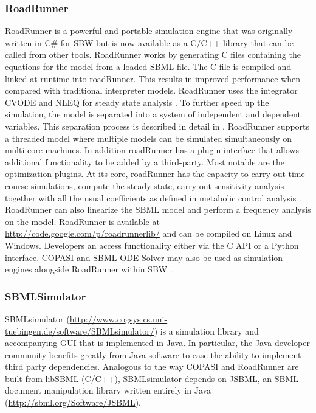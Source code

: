 \subsubsection{RoadRunner}

RoadRunner is a powerful and portable simulation engine that was
originally written in C\# for SBW but is now available as a C/C++
library that can be called from other tools. RoadRunner works by
generating C files containing the equations for the model from a loaded
SBML file. The C file is compiled and linked at runtime into roadRunner.
This results in improved performance when compared with traditional
interpreter models. RoadRunner uses the integrator CVODE and NLEQ for
steady state analysis \autocite{cohen1996cvode}. To further speed up the
simulation, the model is separated into a system of independent and
dependent variables. This separation process is described in detail in
\autocite{vallabhajosyula2006conservation}. RoadRunner supports a
threaded model where multiple models can be simulated simultaneously on
multi-core machines. In addition roadRunner has a plugin interface that
allows additional functionality to be added by a third-party. Most
notable are the optimization plugins. At its core, roadRunner has the
capacity to carry out time course simulations, compute the steady state,
carry out sensitivity analysis together with all the usual coefficients
as defined in metabolic control analysis \autocite{hofmeyr-nutshell}.
RoadRunner can also linearize the SBML model and perform a frequency
analysis on the model. RoadRunner is available at
\url{http://code.google.com/p/roadrunnerlib/} and can be compiled on
Linux and Windows. Developers an access functionality either via the C
API or a Python interface. COPASI and SBML ODE Solver may also be used
as simulation engines alongside RoadRunner within SBW
\autocite{bergmann2008comparing}.

\subsubsection{SBMLSimulator}

SBMLsimulator
(\url{http://www.cogsys.cs.uni-tuebingen.de/software/SBMLsimulator/})
\autocite{drager2011jsbml} is a simulation library and accompanying GUI
that is implemented in Java. In particular, the Java developer community
benefits greatly from Java software to ease the ability to implement
third party dependencies. Analogous to the way COPASI and RoadRunner are
built from libSBML (C/C++), SBMLsimulator depends on JSBML, an SBML
document manipulation library written entirely in Java
(\url{http://sbml.org/Software/JSBML}).

